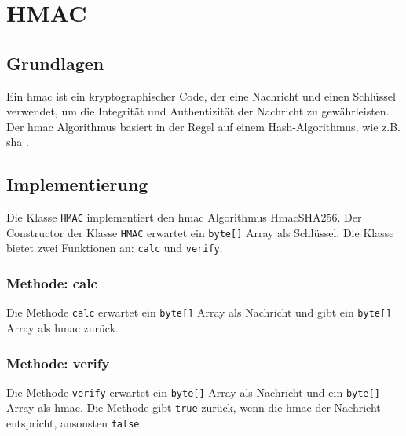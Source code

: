 \chapter{HMAC}

\section{Grundlagen}
Ein \gls{hmac} ist ein kryptographischer Code, der eine Nachricht und einen Schlüssel verwendet, um die Integrität und Authentizität der Nachricht zu gewährleisten. Der \gls{hmac} Algorithmus basiert in der Regel auf einem Hash-Algorithmus, wie z.B. \gls{sha} \cite{rfc2104}.

\section{Implementierung}
Die Klasse \texttt{HMAC} implementiert den \gls{hmac} Algorithmus \glqq HmacSHA256\grqq.
Der Constructor der Klasse \texttt{HMAC} erwartet ein \texttt{byte[]} Array als Schlüssel.
Die Klasse bietet zwei Funktionen an: \texttt{calc} und \texttt{verify}.

\subsection{Methode: calc}
Die Methode \texttt{calc} erwartet ein \texttt{byte[]} Array als Nachricht und gibt ein \texttt{byte[]} Array als \gls{hmac} zurück.

\subsection{Methode: verify}
Die Methode \texttt{verify} erwartet ein \texttt{byte[]} Array als Nachricht und ein \texttt{byte[]} Array als \gls{hmac}.
Die Methode gibt \texttt{true} zurück, wenn die \gls{hmac} der Nachricht entspricht, ansonsten \texttt{false}.

